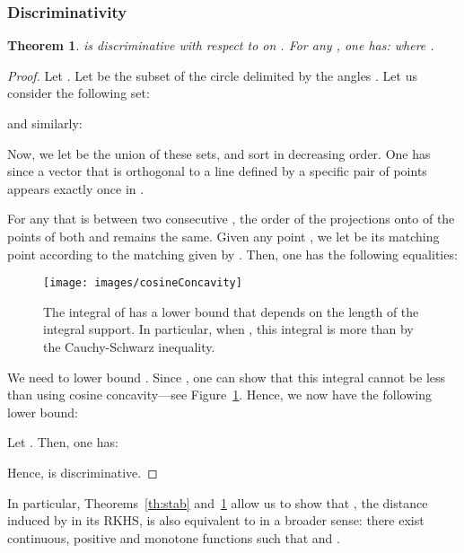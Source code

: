\documentclass[11pt]{article}
\newtheorem{thm}{Theorem}[section]
\begin{document}
\subsubsection{Discriminativity}

\begin{thm}\label{th:discr}
  is {\em discriminative} with respect to  on .
For any , one has: 
where . 
\end{thm}

\begin{proof}
Let . Let  be the subset of the circle delimited by the angles .
Let us consider the following set:

and similarly:

Now, we let  be the union of these sets, 
and sort  in decreasing order.
One has  since a vector  that is orthogonal to a line defined by a specific pair of 
points  appears exactly once in .

For any  that is between two consecutive , the order of the projections 
onto  of the points of both  and  remains the same. Given any point , 
we let  be its matching point according 
to the matching given by .
Then, one has the following equalities:




\begin{figure}\begin{center} 
\texttt{[image: images/cosineConcavity]}
\caption{\label{fig:cosineConc}
The integral of  has a lower bound that depends on the length of the integral support.
In particular, when , this integral is more than  
by the Cauchy-Schwarz inequality.}
\end{center}\end{figure}

We need to lower bound .
Since , one can show that this integral cannot be less than  
using cosine concavity---see Figure~\ref{fig:cosineConc}. 
Hence, we now have the following lower bound:
 


Let . Then, one has:



Hence,  is discriminative.
\end{proof}

In particular, Theorems~\ref{th:stab} and~\ref{th:discr} allow us to show that , the distance induced by  in its RKHS,
is also equivalent to  in a broader sense: there exist continuous, positive and monotone functions  such that 
and . \\
 
\end{document}
